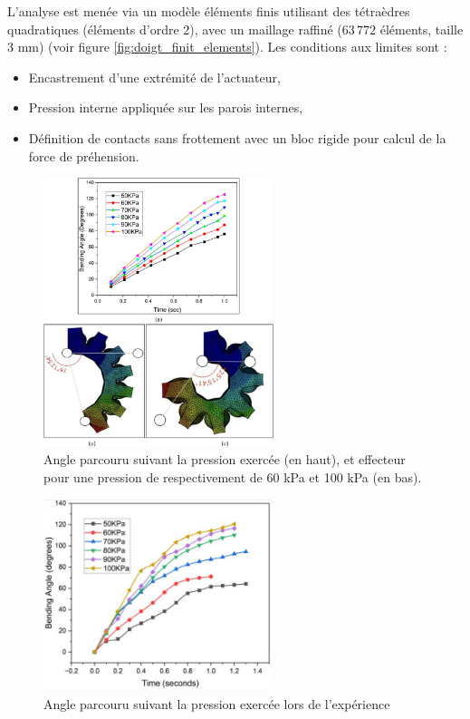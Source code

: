 \documentclass[a4paper, 11pt]{report}
\begin{document}
            L’analyse est menée via un modèle éléments finis utilisant des tétraèdres quadratiques (éléments d'ordre 2), avec un maillage raffiné (\( 63\,772 \) éléments, taille 3 mm) (voir figure \ref{fig:doigt_finit_elements}). Les conditions aux limites sont :
            \begin{itemize}
            \item Encastrement d’une extrémité de l’actuateur,
            \item Pression interne appliquée sur les parois internes,
            \item Définition de contacts sans frottement avec un bloc rigide pour calcul de la force de préhension.
            \end{itemize}

            \begin{figure}
                \centering
                \includegraphics[width=0.6\textwidth]{Figures/angle_pression.jpg}
                \caption{Angle parcouru suivant la pression exercée (en haut), et effecteur pour une pression de respectivement de 60 kPa et 100 kPa (en bas).\cite{bhat_numerical_2025}}
                \label{fig:angle_pression}
            \end{figure}

            \begin{figure}
                \centering
                \includegraphics[width=0.6\textwidth]{Figures/angle_pression_experiments.PNG}
                \caption{Angle parcouru suivant la pression exercée lors de l'expérience \cite{bhat_numerical_2025}}
                \label{fig:angle_pression_experiments}
            \end{figure}
\end{document}
